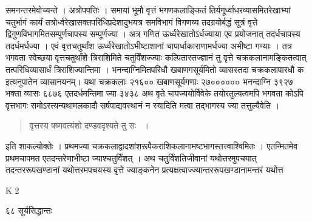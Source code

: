 \documentclass[11pt, openany]{book}
\begin{document}
\begin{sloppypar}

\noindent समनन्तरमेवोच्यन्ते । अत्रोपपत्तिः । समायां भूमौ वृत्तं भगणकलाङ्कितं तिर्यगूर्ध्वाधरव्यासमितरेखाभ्यां चतुर्भागं कार्यं तत्रोर्ध्वरेखासक्तपरिधिप्रदेशादुभयत्र समविभागं विगणय्य तदग्रयोर्बद्धं सूत्रं वृत्ते द्विगुणविभागमितसम्पूर्णचापस्य सम्पूर्णज्या । अत्र गणित ऊर्ध्वरेखातोऽर्धज्याया एव प्रयोजनात् तदर्धचापस्य तदर्धमर्धज्या । एवं वृत्तचतुर्थांश ऊर्ध्वरेखातोऽभीष्टाशानां चापार्धाकाराणामर्धज्या अभीष्टा गण्याः । तत्र भगवता स्वेच्छया वृत्तचतुर्थांशे त्रिराशिमिते चतुर्विंशज्ज्याः कल्पितास्तज्ज्ञानं तु वृत्ते चक्रकलानामङ्कितत्वात् तत्परिधिव्यासार्धं त्रिराशिज्यान्तिमा । भनन्दाग्निमितपरिधौ खबाणगसूर्यमितो व्यासस्तदा चक्रकलापारधौ क इत्यनुपातेन व्यासानयनम्। यथा चक्रकलाः २१६०० खबाणसूर्यगणाः २७०००००० भनन्दाग्नि ३९२७ भक्ता व्यासः ६८७६ एतदर्धमन्तिमा ज्या ३४३८ अथ वृते चापज्ययोर्विवेके तयोरतुल्यत्वमपि भगवता कोऽपि वृत्तभागः समोऽस्त्यन्यथामलकादौ सर्षपाद्यवस्थानं न स्यादिति मत्वा तद्भागस्य ज्या तत्तुल्यैवेति ।
\end{sloppypar}
\begin{quote}

{\qt वृत्तस्य षष्णवत्यंशो दण्डवदृश्यते तु सः ~।} 
\end{quote}
\begin{sloppypar}
इति शाकल्योक्तेः । प्रथमज्या चक्रकलाद्वादशांशरूपैकराशिकलानामष्टभागस्तत्त्वाश्विमितः । एतन्मितमेव प्रथमचापमत एतदन्तरेणाभीष्टा ज्याश्चतुर्विंशत् । अथ चतुर्विंशतिजीवानां यथोत्तरमुपचयात् तदन्तररूपखण्डानां यथोत्तरमपचयस्य वृत्ते ज्याङ्कनेन प्रत्यक्षत्वाज्ज्यान्तररूपखण्डानामन्तरं यथोत्त\textendash
\end{sloppypar}
{\tiny{K 2}}

\newpage

\noindent ६८ \hspace{4cm} सूर्यसिद्धान्तः
\vspace{1cm}
\end{document}

